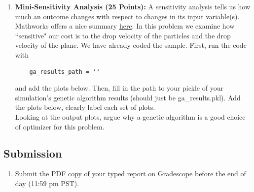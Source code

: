 \documentclass{article}
\begin{document}
\begin{enumerate}
\item[4.] \textbf{Mini-Sensitivity Analysis (25 Points):}
A sensitivity analysis tells us how much an outcome changes with respect to changes in its input variable(s). Mathworks offers a nice summary \href{https://www.mathworks.com/help/sldo/ug/what-is-sensitivity-analysis.html}{here}. In this problem we examine how ``sensitive" our cost is to the drop velocity of the particles and the drop velocity of the plane. We have already coded the sample. First, run the code with 
\begin{lstlisting}
    ga_results_path = ''
\end{lstlisting}
and add the plots below. Then, fill in the path to your pickle of your simulation's genetic algorithm results (should just be ga\_results.pkl). Add the plots below, clearly label each set of plots.\\
Looking at the output plots, argue why a genetic algorithm is a good choice of optimizer for this problem.

\begin{answer}
\end{answer}

\end{enumerate}

\subsection*{Submission}
\begin{enumerate}
    \item Submit the PDF copy of your typed report on Gradescope before the end of day (11:59 pm PST).
\end{enumerate}


\end{document}
